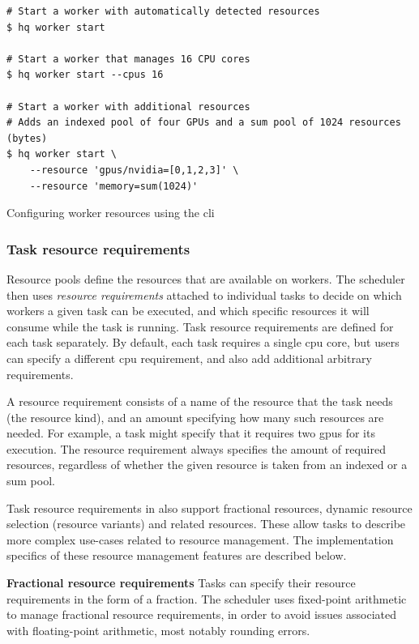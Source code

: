 \begin{listing}[h]
	\begin{verbatim}
# Start a worker with automatically detected resources
$ hq worker start

# Start a worker that manages 16 CPU cores
$ hq worker start --cpus 16

# Start a worker with additional resources
# Adds an indexed pool of four GPUs and a sum pool of 1024 resources (bytes)
$ hq worker start \
	--resource 'gpus/nvidia=[0,1,2,3]' \
	--resource 'memory=sum(1024)'
	\end{verbatim}
	\caption{Configuring worker resources using the \hyperqueue{} \gls{cli}}
	\label{lst:hq-cli-worker-resources}
\end{listing}

\subsubsection*{Task resource requirements}
Resource pools define the resources that are available on workers. The scheduler then uses
\emph{resource requirements} attached to individual tasks to decide on which workers a given task can be
executed, and which specific resources it will consume while the task is running. Task resource
requirements are defined for each task separately. By default, each task requires a single
\gls{cpu} core, but users can specify a different \gls{cpu}
requirement, and also add additional arbitrary requirements.

A resource requirement consists of a name of the resource that the task needs (the resource kind),
and an amount specifying how many such resources are needed. For example, a task might specify that it requires two \glspl{gpu} for its execution. The resource requirement always specifies the amount
of required resources, regardless of whether the given resource is taken from an indexed or a sum
pool.

Task resource requirements in \hyperqueue{} also support fractional resources, dynamic resource
selection (resource variants) and related resources. These allow tasks to describe more complex
use-cases related to resource management. The implementation specifics of these resource management
features are described below.

\textbf{Fractional resource requirements} Tasks can specify
their resource requirements in the form of a fraction. The scheduler uses fixed-point arithmetic to manage fractional resource requirements, in order to avoid issues associated with floating-point arithmetic, most notably rounding errors.

